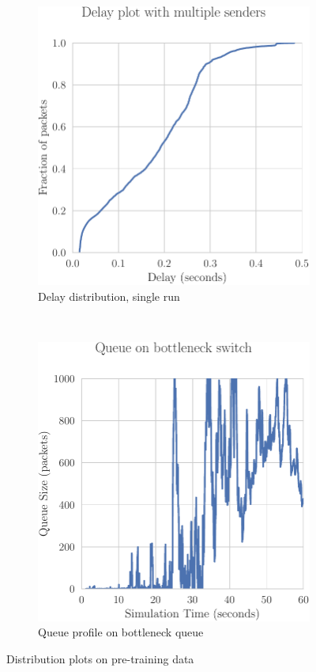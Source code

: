 \begin{figure}[h]
    \centering
    \begin{subfigure}[h]{0.5\textwidth}
        \centering
        \includegraphics[scale=0.55]{figures/delay.pdf}
        \caption{Delay distribution, single run}
    \end{subfigure}%
    ~ 
    \begin{subfigure}[h]{0.5\textwidth}
        \centering
        \includegraphics[scale=0.55]{figures/queue_profile_A.pdf}
        \caption{Queue profile on bottleneck queue}
    \end{subfigure}
    \caption{Distribution plots on pre-training data}
    \label{fig:datadist}
\end{figure}

